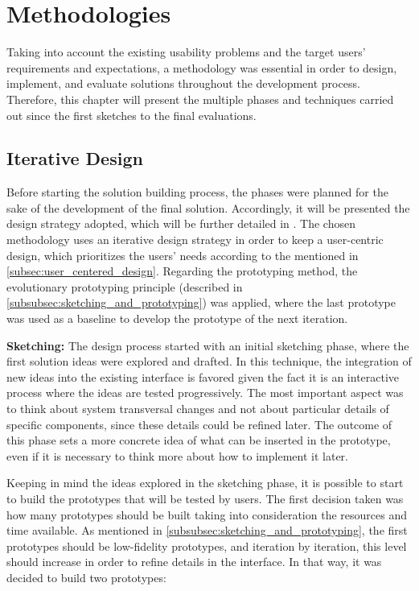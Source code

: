 

\chapter{Methodologies}
\label{cha:methodologies}
Taking into account the existing usability problems and the target users' requirements and expectations, a methodology was essential in order to design, implement, and evaluate solutions throughout the development process. Therefore, this chapter will present the multiple phases and techniques carried out since the first sketches to the final evaluations.

\section{Iterative Design}
\label{sec:iterative_design}
Before starting the solution building process, the phases were planned for the sake of the development of the final solution. Accordingly, it will be presented the design strategy adopted, which will be further detailed in . The chosen methodology uses an iterative design strategy in order to keep a user-centric design, which prioritizes the users' needs according to the mentioned in \ref{subsec:user_centered_design}. Regarding the prototyping method, the evolutionary prototyping principle (described in \ref{subsubsec:sketching_and_prototyping}) was applied, where the last prototype was used as a baseline to develop the prototype of the next iteration.

\textbf{Sketching: }The design process started with an initial sketching phase, where the first solution ideas were explored and drafted. In this technique, the integration of new ideas into the existing interface is favored given the fact it is an interactive process where the ideas are tested progressively. The most important aspect was to think about system transversal changes and not about particular details of specific components, since these details could be refined later. The outcome of this phase sets a more concrete idea of what can be inserted in the prototype, even if it is necessary to think more about how to implement it later.

Keeping in mind the ideas explored in the sketching phase, it is possible to start to build the prototypes that will be tested by users. The first decision taken was how many prototypes should be built taking into consideration the resources and time available. As mentioned in \ref{subsubsec:sketching_and_prototyping}, the first prototypes should be low-fidelity prototypes, and iteration by iteration, this level should increase in order to refine details in the interface. In that way, it was decided to build two prototypes:


